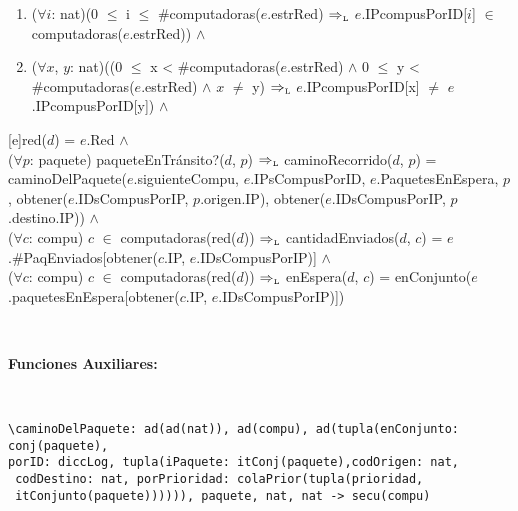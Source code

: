 \begin{Representacion}
{\begin{enumerate}
\item    ($\forall i$: nat)(0 $\leq$ i $\leq$ \#computadoras($e$.estrRed) $\Rightarrow_{\mathrm{\scriptscriptstyle{L}}}$ $e$.IPcompusPorID[$i$] $\in$ computadoras($e$.estrRed)) $\land$ 

\item    ($\forall x$, $y$: nat)((0 $\leq$ x < \#computadoras($e$.estrRed) $\land$ 0 $\leq$ y < \#computadoras($e$.estrRed) $\land$ $x$ $\neq$ y) $\Rightarrow_{\mathrm{\scriptscriptstyle{L}}}$ $e$.IPcompusPorID[x] $\neq$ $e$.IPcompusPorID[y]) $\land$ 


    \end{enumerate} 
    
    }\mbox{} %

\pagebreak

[e]{red($d$) = $e$.Red $\land$ \\

  ($\forall p$: paquete) paqueteEnTr\'ansito?($d$, $p$) $\Rightarrow_{\mathrm{\scriptscriptstyle{L}}}$ caminoRecorrido($d$, $p$) = caminoDelPaquete($e$.siguienteCompu, $e$.IPsCompusPorID, $e$.PaquetesEnEspera, $p$, obtener($e$.IDsCompusPorIP, $p$.origen.IP), obtener($e$.IDsCompusPorIP, $p$.destino.IP)) $\land$ \\

  ($\forall c$: compu) $c$ $\in$ computadoras(red($d$)) $\Rightarrow_{\mathrm{\scriptscriptstyle{L}}}$ cantidadEnviados($d$, $c$) = $e$.\#PaqEnviados[obtener($c$.IP, $e$.IDsCompusPorIP)] $\land$ \\

  ($\forall c$: compu) $c$ $\in$ computadoras(red($d$)) $\Rightarrow_{\mathrm{\scriptscriptstyle{L}}}$ enEspera($d$, $c$) = enConjunto($e$.paquetesEnEspera[obtener($c$.IP, $e$.IDsCompusPorIP)])
}

  ~

  \textbf{Funciones Auxiliares:}

  ~


\small\begin{verbatim}
\caminoDelPaquete: ad(ad(nat)), ad(compu), ad(tupla(enConjunto: conj(paquete), 
porID: diccLog, tupla(iPaquete: itConj(paquete),codOrigen: nat, 
 codDestino: nat, porPrioridad: colaPrior(tupla(prioridad, 
 itConjunto(paquete)))))), paquete, nat, nat -> secu(compu)  
\end{verbatim}


\end{Representacion}
